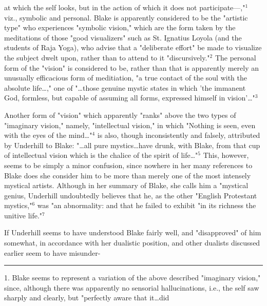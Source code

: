 \noindent at which the self looks, but in the action
of which it does not participate---,"$^{1}$ viz., symbolic and
personal. Blake is apparently considered to be the "artistic type" who
experiences "symbolic vision," which are the form taken by the 
meditations of those "good visualizers" such as St. Ignatius Loyola (and the students of Raja Yoga),
who advise that a "deliberate effort" be made to visualize the subject dwelt upon, rather than to attend
to it "discursively."$^{2}$ The personal form of the "vision" is considered to be, rather than
that is apparently merely an unusually efficacious form of meditiation, "a true contact of the soul with
the absolute life\dots," one of "\dots those genuine mystic states in which 'the immanent God, formless, but capable
of assuming all forms, expressed himself in vision'\dots"$^{3}$\par
\vspace*{0.5\baselineskip}
Another form of "vision" which apparently "ranks" above the
two types of "imaginary vision," namely, "intellectual vision," in 
which "Nothing is seen, even with the eyes of the mind\dots"$^{4}$ is also, though
inconsistently and falsely, attributed by Underhill to Blake: "\dots all pure mystics\dots have drunk, with Blake, from
that cup of intellectual vision which is the chalice of the spirit of life\dots"$^{5}$ This, however, seems to be simply a 
minor confusion, since nowhere in her many references to Blake does she consider him to be more than merely one of the most
intensely mystical artists. Although in her summary of Blake, she calls him a "mystical genius, Underhill undoubtedly believes that
he, as the other "English Protestant mystics,"$^{6}$ was "an abnormality: and that he failed to exhibit "in its richness
the unitive life."$^{7}$\par
\vspace*{0.5\baselineskip}
If Underhill seems to have understood Blake fairly well, and "disapproved" of him somewhat, in accordance with her
dualistic position, and other dualists discussed earlier seem to have misunder-\linebreak
\null\par
\vspace*{-\baselineskip}
\vspace*{\fill}
\noindent\rule{0.25\textwidth}{0.4pt}\par
1. Blake seems to represent a variation of the above described "imaginary vision," since, although there was
apparently no sensorial hallucinations, i.e., the self saw sharply and clearly, but "perfectly aware that it\dots did
